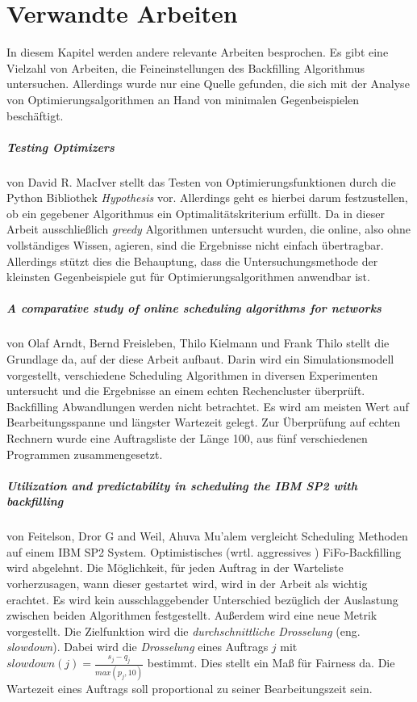 \chapter{Verwandte Arbeiten}
\label{chap:related_work}
In diesem Kapitel werden andere relevante Arbeiten besprochen. Es gibt eine Vielzahl von Arbeiten, die Feineinstellungen des Backfilling Algorithmus untersuchen. Allerdings wurde nur eine Quelle gefunden, die sich mit der Analyse von Optimierungsalgorithmen an Hand von minimalen Gegenbeispielen beschäftigt.

\paragraph{Testing Optimizers} von David R. MacIver \cite{TestOpt} stellt das Testen von Optimierungsfunktionen durch die Python Bibliothek \emph{Hypothesis} vor. Allerdings geht es hierbei darum festzustellen, ob ein gegebener Algorithmus ein Optimalitätskriterium erfüllt. Da in dieser Arbeit ausschließlich \emph{greedy} Algorithmen untersucht wurden, die online, also ohne vollständiges Wissen, agieren, sind die Ergebnisse nicht einfach übertragbar. Allerdings stützt dies die Behauptung, dass die Untersuchungsmethode der kleinsten Gegenbeispiele gut für Optimierungsalgorithmen anwendbar ist.

\paragraph{A comparative study of online scheduling algorithms for networks} von Olaf Arndt, Bernd Freisleben, Thilo Kielmann und Frank Thilo \cite{Arn99} stellt die Grundlage da, auf der diese Arbeit aufbaut. Darin wird ein Simulationsmodell vorgestellt, verschiedene Scheduling Algorithmen in diversen Experimenten untersucht und die Ergebnisse an einem echten Rechencluster überprüft. Backfilling Abwandlungen werden nicht betrachtet. Es wird am meisten Wert auf Bearbeitungsspanne und längster Wartezeit gelegt. Zur Überprüfung auf echten Rechnern wurde eine Auftragsliste der Länge 100, aus fünf verschiedenen Programmen zusammengesetzt.

\paragraph{Utilization and predictability in scheduling the IBM SP2 with backfilling}
von Feitelson, Dror G and Weil, Ahuva Mu'alem \cite{optVsCons} vergleicht Scheduling Methoden auf einem IBM SP2 System. Optimistisches (wrtl. aggressives \cite[p. ~ 543]{optVsCons}) FiFo-Backfilling wird abgelehnt. Die Möglichkeit, für jeden Auftrag in der Warteliste vorherzusagen, wann dieser gestartet wird, wird in der Arbeit als wichtig erachtet. Es wird kein ausschlaggebender Unterschied bezüglich der Auslastung zwischen beiden Algorithmen festgestellt. Außerdem wird eine neue Metrik vorgestellt.
Die Zielfunktion wird die \emph{durchschnittliche Drosselung} (eng. \emph{slowdown}). Dabei wird die \emph{Drosselung} eines Auftrags $j$ mit $slowdown(j) = \frac{s_j - q_j}{max(p_j,10)}$ bestimmt. Dies stellt ein Maß für Fairness da. Die Wartezeit eines Auftrags soll proportional zu seiner Bearbeitungszeit sein.


